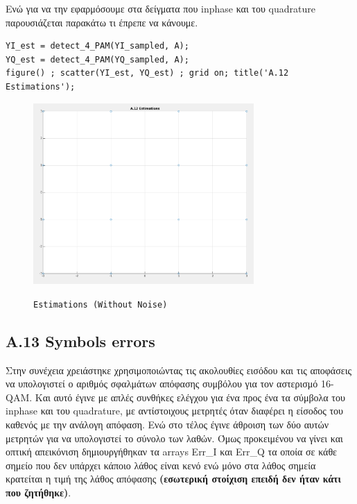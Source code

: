 \documentclass[11pt]{article}
\begin{document}
    \par \noindent
    Ενώ για να την εφαρμόσουμε στα δείγματα που inphase και του quadrature παρουσιάζεται παρακάτω τι έπρεπε να κάνουμε.
    
    \begin{lstlisting}[caption = {A.12 \texttt{Setect Symbols}}]
% A.12
YI_est = detect_4_PAM(YI_sampled, A); 
YQ_est = detect_4_PAM(YQ_sampled, A); 
figure() ; scatter(YI_est, YQ_est) ; grid on; title('A.12 Estimations');
    \end{lstlisting}
    
    \begin{figure}[H]
        \centering
        \includegraphics[scale=0.5, width=0.75\textwidth]{img/A12_without_noise.png} \\
        \caption{\texttt{Estimations (Without Noise)}}
    \end{figure}
    
    \subsection*{A.13 Symbols errors}
    Στην συνέχεια χρειάστηκε χρησιμοποιώντας τις ακολουθίες εισόδου και τις αποφάσεις να υπολογιστεί ο αριθμός σφαλμάτων απόφασης συμβόλου για τον αστερισμό 16-QAM.
    Και αυτό έγινε με απλές συνθήκες ελέγχου για ένα προς ένα τα σύμβολα του inphase και του quadrature, με αντίστοιχους μετρητές όταν διαφέρει η είσοδος του καθενός με την ανάλογη απόφαση. 
    Ενώ στο τέλος έγινε άθροιση των δύο αυτών μετρητών για να υπολογιστεί το σύνολο των λαθών. 
    Όμως προκειμένου να γίνει και οπτική απεικόνιση δημιουργήθηκαν τα arrays Err\_I και Err\_Q τα οποία σε κάθε σημείο που δεν υπάρχει κάποιο λάθος είναι κενό ενώ μόνο στα λάθος σημεία κρατείται η τιμή της λάθος απόφασης \textbf{(εσωτερική στοίχιση επειδή δεν ήταν κάτι που ζητήθηκε)}.
    
\end{document}
